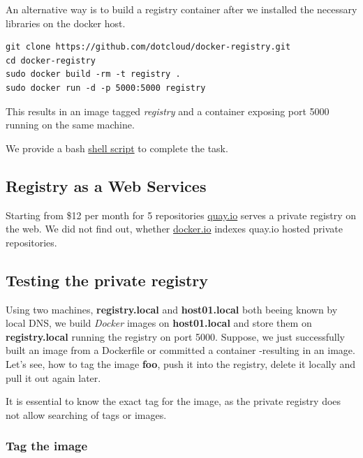 \documentclass[captions=tableheading]{article}
\begin{document}
An alternative way is to build a registry container after we installed the necessary libraries on the docker host.

\begin{verbatim}
git clone https://github.com/dotcloud/docker-registry.git
cd docker-registry
sudo docker build -rm -t registry .
sudo docker run -d -p 5000:5000 registry
\end{verbatim}
This results in an image tagged \emph{registry} and a container exposing port 5000 running on the same machine.

We provide a bash \href{file://.registry/buildRegistry.sh}{shell script} to complete the task.
\subsection{Registry as a Web Services}
\label{sec-3-6}

Starting from \$12 per month for 5 repositories \href{https://quay.io/}{quay.io} serves a private registry on the web. We did not find out, whether \href{https://index.docker.io/}{docker.io} indexes quay.io hosted private repositories.
\subsection{Testing the private registry}
\label{sec-3-7}

Using two machines, \textbf{registry.local} and \textbf{host01.local} both beeing known by local DNS, we build \emph{Docker} images on \textbf{host01.local} and store them on \textbf{registry.local} running the registry on port 5000.  Suppose, we just successfully built an image from a Dockerfile or committed a container -resulting in an image. Let's see, how to tag the image \textbf{foo}, push it into the registry, delete it locally and pull it out again later. 

It is essential to know the exact tag for the image, as the private registry does not allow searching of tags or images. 
\subsubsection{Tag the image}
\label{sec-3-7-1}
\end{document}
